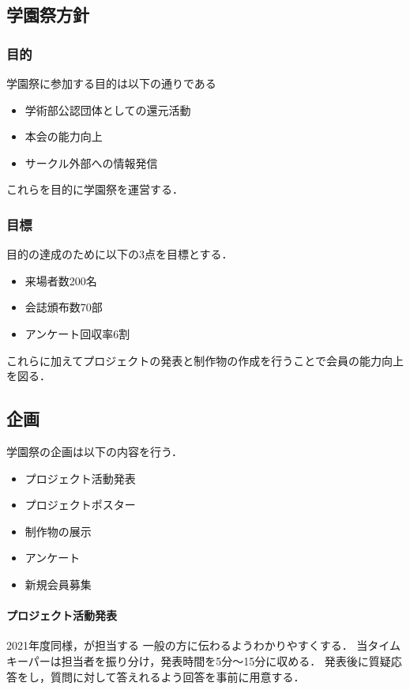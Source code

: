 \subsection*{学園祭方針}



\subsubsection*{目的}
学園祭に参加する目的は以下の通りである
\begin{itemize}
    \item 学術部公認団体としての還元活動
    \item 本会の能力向上
    \item サークル外部への情報発信
\end{itemize}
これらを目的に学園祭を運営する．

\subsubsection*{目標}
目的の達成のために以下の3点を目標とする．
\begin{itemize}
    \item 来場者数200名
    \item 会誌頒布数70部
    \item アンケート回収率6割
\end{itemize}
これらに加えてプロジェクトの発表と制作物の作成を行うことで会員の能力向上を図る．

\subsection*{企画}
学園祭の企画は以下の内容を行う．
\begin{itemize}
    \item プロジェクト活動発表
    \item プロジェクトポスター
    \item 制作物の展示
    \item アンケート
    \item 新規会員募集
\end{itemize}
\paragraph{プロジェクト活動発表}
2021年度同様\firstGrade{}，\secondGrade{}が担当する
一般の方に伝わるようわかりやすくする．
当タイムキーパーは担当者を振り分け，発表時間を5分～15分に収める．
発表後に質疑応答をし，質問に対して答えれるよう回答を事前に用意する．        
